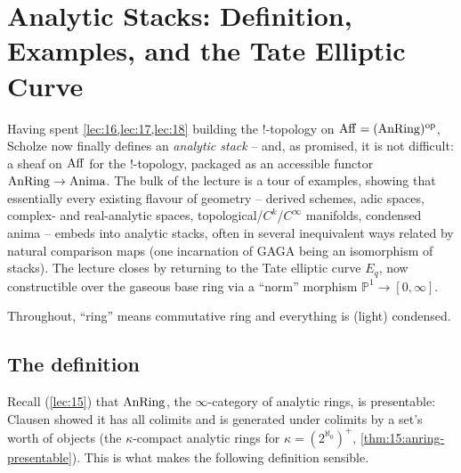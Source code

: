 \section{Analytic Stacks: Definition, Examples, and the Tate Elliptic Curve}
\label{lec:19}

Having spent \cref{lec:16,lec:17,lec:18} building the $!$-topology on
$\operatorname{Aff}=(\operatorname{AnRing})^{\mathrm{op}}$, Scholze now finally defines an
\emph{analytic stack} -- and, as promised, it is not difficult: a sheaf on
$\operatorname{Aff}$ for the $!$-topology, packaged as an accessible functor
$\operatorname{AnRing}\to\operatorname{Anima}$. The bulk of the lecture is a tour of examples,
showing that essentially every existing flavour of geometry -- derived schemes,
adic spaces, complex- and real-analytic spaces, topological/$C^k$/$C^\infty$
manifolds, condensed anima -- embeds into analytic stacks, often in several
inequivalent ways related by natural comparison maps (one incarnation of GAGA
being an isomorphism of stacks). The lecture closes by returning to the Tate
elliptic curve $E_q$, now constructible over the gaseous base ring via a
``norm'' morphism $\mathbb P^1\to[0,\infty]$.

Throughout, ``ring'' means commutative ring and everything is (light) condensed.

\subsection{The definition}
\label{subsec:19:definition}

Recall (\cref{lec:15}) that $\operatorname{AnRing}$, the $\infty$-category of analytic rings,
is presentable: Clausen showed it has all colimits and is generated under
colimits by a set's worth of objects (the $\kappa$-compact analytic rings for
$\kappa=(2^{\aleph_0})^+$, \cref{thm:15:anring-presentable}). This is what makes
the following definition sensible.

